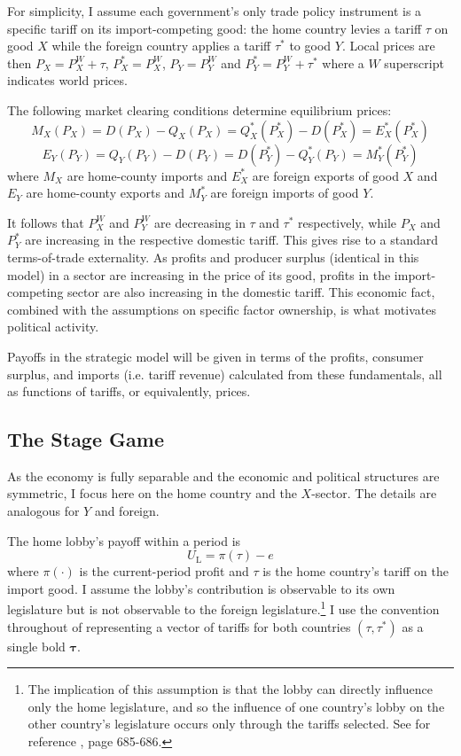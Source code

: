 \documentclass[authoryear, review]{elsarticle}
\begin{document}
For simplicity, I assume each government's only trade policy instrument is a specific tariff on its import-competing good: the home country levies a tariff $\tau$ on good $X$ while the foreign country applies a tariff $\tau^*$ to good $Y$. Local prices are then $P_X = P_X^W + \tau$, $P_X^* = P_X^W$, $P_Y = P_Y^W$ and $P_Y^* = P_Y^W + \tau^*$ where a $W$ superscript indicates world prices.

The following market clearing conditions determine equilibrium prices:
$$M_X(P_X)= D(P_X)-Q_X(P_X) = Q_X^*(P_X^*) - D(P_X^*) = E_X^*(P_X^*)$$
$$E_Y(P_Y)=Q_Y(P_Y)-D(P_Y) = D(P_Y^*)-Q_Y^*(P_Y) = M_Y^*(P_Y^*)$$
where $M_X$ are home-county imports and $E_X^*$ are foreign exports of good $X$ and $E_Y$ are home-county exports and $M_Y^*$ are foreign imports of good $Y$.

It follows that $P_X^W$ and $P_Y^W$ are decreasing in $\tau$ and $\tau^*$ respectively, while $P_X$ and $P_Y^*$ are increasing in the respective domestic tariff. This gives rise to a standard terms-of-trade externality. As profits and producer surplus (identical in this model) in a sector are increasing in the price of its good, profits in the import-competing sector are also increasing in the domestic tariff. This economic fact, combined with the assumptions on specific factor ownership, is what motivates political activity.

Payoffs in the strategic model will be given in terms of the profits, consumer surplus, and imports (i.e. tariff revenue) calculated from these fundamentals, all as functions of tariffs, or equivalently, prices.

\subsection{The Stage Game}
\label{sec:stage}
As the economy is fully separable and the economic and political structures are symmetric, I focus here on the home country and the $X$-sector. The details are analogous for $Y$ and foreign.

The home lobby's payoff within a period is
\begin{equation}
  U_\text{L} = \pi(\tau)-e
  \label{eq:lv3}
\end{equation}
where $\pi(\cdot)$ is the current-period profit and $\tau$ is the home country's tariff on the import good. I assume the lobby's contribution is observable to its own legislature but is not observable to the foreign legislature.\footnote{The implication of this assumption is that the lobby can directly influence only the home legislature, and so the influence of one country's lobby on the other country's legislature occurs only through the tariffs selected. See for reference \citet{gh95}, page 685-686.} I use the convention throughout of representing a vector of tariffs for both countries $(\tau,\tau^*)$ as a single bold $\bm{\tau}$. 
\end{document}
